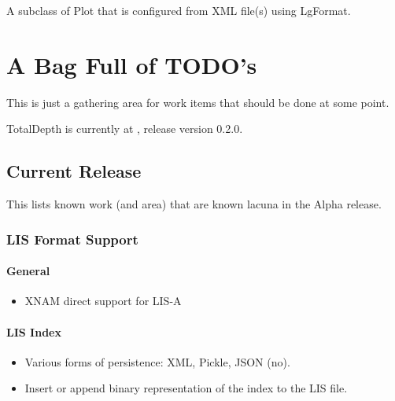 \documentclass[letterpaper,10pt,english]{sphinxmanual}
\begin{document}
\begin{fulllineitems}
\label{\detokenize{ref/util/plot/Plot:TotalDepth.util.plot.Plot.PlotReadXML}}
A subclass of Plot that is configured from XML file(s) using LgFormat.

\end{fulllineitems}



\section{A Bag Full of TODO’s}
\label{\detokenize{TODO::doc}}\label{\detokenize{TODO:a-bag-full-of-todo-s}}
This is just a gathering area for work items that should be done at some point.

TotalDepth is currently at , release version 0.2.0.


\subsection{Current Release}
\label{\detokenize{TODO:current-release}}
This lists known work (and area) that are known lacuna in the Alpha release.


\subsubsection{LIS Format Support}
\label{\detokenize{TODO:lis-format-support}}

\paragraph{General}
\label{\detokenize{TODO:general}}\begin{itemize}
\item {} 
XNAM direct support for LIS-A

\end{itemize}


\paragraph{LIS Index}
\label{\detokenize{TODO:lis-index}}\begin{itemize}
\item {} 
Various forms of persistence: XML, Pickle, JSON (no).

\item {} 
Insert or append binary representation of the index to the LIS file.

\end{itemize}
\end{document}
